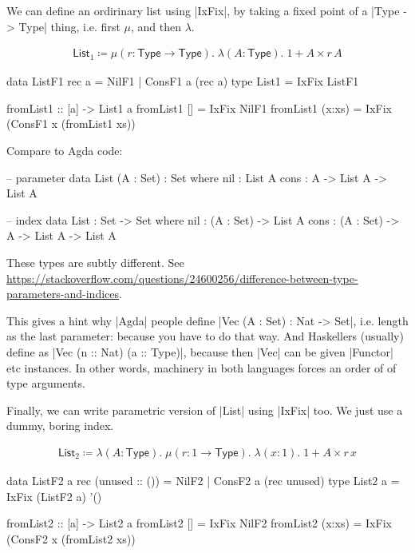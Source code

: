 We can define an ordirinary list using |IxFix|,
by taking a fixed point of a |Type -> Type| thing,
i.e. first $\mu$, and then $\lambda$.

\begin{align*}
  \mathsf{List}_1 \coloneqq \mu (r : \mathsf{Type} \to \mathsf{Type}).\; \lambda (A : \mathsf{Type}).\; 1 + A \times r\,A
\end{align*}

\begin{code}
data ListF1 rec a = NilF1 | ConsF1 a (rec a)
type List1 = IxFix ListF1

fromList1 :: [a] -> List1 a
fromList1 []     = IxFix NilF1
fromList1 (x:xs) = IxFix (ConsF1 x (fromList1 xs))
\end{code}

Compare to Agda code:

\begin{code}
-- parameter
data List (A : Set) : Set where
    nil  : List A
    cons : A -> List A -> List A

-- index
data List : Set -> Set where
    nil :  (A : Set) -> List A
    cons : (A : Set) -> A -> List A -> List A
\end{code}

These types are subtly different.
See \url{https://stackoverflow.com/questions/24600256/difference-between-type-parameters-and-indices}.

This gives a hint why |Agda| people define |Vec (A : Set) : Nat -> Set|,
i.e. length as the last parameter: because you have to do that way.
And Haskellers (usually) define as |Vec (n :: Nat) (a :: Type)|,
because then |Vec| can be given |Functor| etc instances.
In other words, machinery in both languages forces an order of
of type arguments.

Finally, we can write parametric version of |List| using
|IxFix| too. We just use a dummy, boring index.

\begin{align*}
  \mathsf{List}_2 \coloneqq
  \lambda (A : \mathsf{Type}).\;
  \mu (r : 1 \to \mathsf{Type}).\;
  \lambda (x : 1).\;
  1 + A \times r\,x
\end{align*}

\begin{code}
data ListF2 a rec (unused :: ()) = NilF2 | ConsF2 a (rec unused)
type List2 a = IxFix (ListF2 a) '()

fromList2 :: [a] -> List2 a
fromList2 []     = IxFix NilF2
fromList2 (x:xs) = IxFix (ConsF2 x (fromList2 xs))
\end{code}

